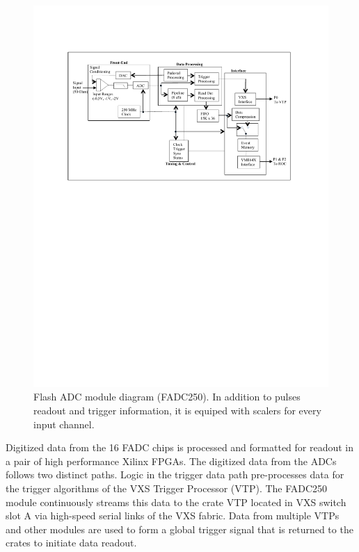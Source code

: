 \begin{figure}[hbt]
	\centering
	\includegraphics[width=1.0\columnwidth,keepaspectratio]{img/FADC250_Diagram.pdf}
	\caption{Flash ADC module diagram (FADC250). In addition to pulses readout and trigger information, it is equiped with scalers for every input channel.}
	\label{fig:FADC250_board}
\end{figure}

Digitized data from the 16 FADC chips is processed and formatted for readout in a pair of high performance Xilinx FPGAs. The digitized data from the ADCs follows two distinct paths.  Logic in the trigger data path pre-processes data for the trigger algorithms of the VXS Trigger Processor (VTP). The FADC250 module continuously streams this data to the crate VTP located in VXS switch slot A via high-speed serial links of the VXS fabric.  Data from multiple VTPs and other modules are used to form a global trigger signal that is returned to the crates to initiate data readout.

